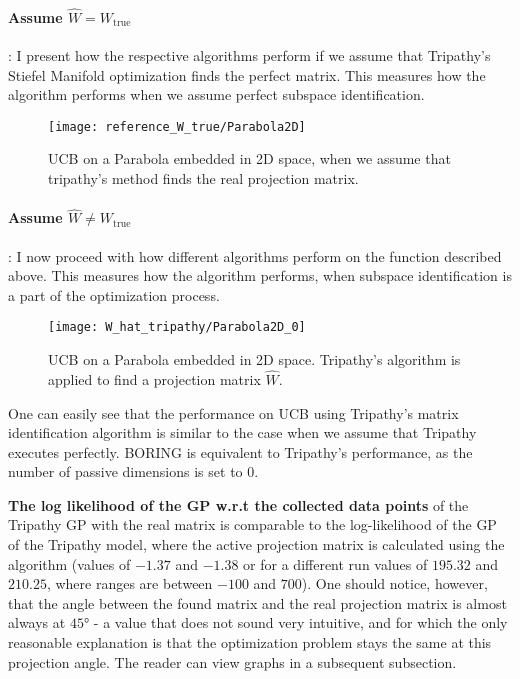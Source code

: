 \paragraph{Assume $\hat{W} = W_{\text{true}}$}: I present how the respective algorithms perform if we assume that Tripathy's Stiefel Manifold optimization finds the perfect matrix.
This measures how the algorithm performs when we assume perfect subspace identification.

\begin{figure}[H]
  \centering
      \texttt{[image: reference\_W\_true/Parabola2D]}
  \caption{UCB on a Parabola embedded in 2D space, when we assume that tripathy's method finds the real projection matrix.}
\end{figure}

\paragraph{Assume $\hat{W} \neq W_{\text{true}}$}: I now proceed with how different algorithms perform on the function described above.
This measures how the algorithm performs, when subspace identification is a part of the optimization process.

\begin{figure}[H]
  \centering
      \texttt{[image: W\_hat\_tripathy/Parabola2D\_0]}
  \caption{UCB on a Parabola embedded in 2D space.
  Tripathy's algorithm is applied to find a projection matrix $\hat{W}$.}
\end{figure}

One can easily see that the performance on UCB using Tripathy's matrix identification algorithm is similar to the case when we assume that Tripathy executes perfectly.
BORING is equivalent to Tripathy's performance, as the number of passive dimensions is set to 0.



\textbf{The log likelihood of the GP w.r.t the collected data points} of the Tripathy GP with the real matrix is comparable to the log-likelihood of the GP of the Tripathy model, where the active projection matrix is calculated using the algorithm (values of $-1.37$ and $-1.38$ or for a different run values of $195.32$ and $210.25$, where ranges are between  $-100$ and $700$).
One should notice, however, that the angle between the found matrix and the real projection matrix is almost always at $45°$ - a value that does not sound very intuitive, and for which the only reasonable explanation is that the optimization problem stays the same at this projection angle.
The reader can view graphs in a subsequent subsection.

